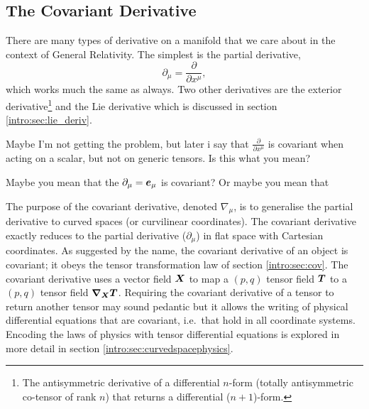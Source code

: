 \subsection{The Covariant Derivative}\label{intro:sec:covariant_derivative}

There are many types of derivative on a manifold that we care about in the context of General Relativity. The simplest is the partial derivative, 
\begin{equation}
\partial_\mu = \frac{\partial}{\partial x^\mu},
\end{equation} 
which works much the same as always. Two other derivatives are the exterior derivative\footnote{The antisymmetric derivative of a differential $n$-form (totally antisymmetric co-tensor of rank $n$) that returns a differential ($n+1$)-form. } and the Lie derivative which is discussed in section \ref{intro:sec:lie_deriv}. 

\color{choral} Maybe I'm not getting the problem, but later i say that $\frac{\partial}{\partial x^\mu}$ is covariant when acting on a scalar, but not on generic tensors. Is this what you mean? \color{black}

\color{choral} Maybe you mean that the $\partial_\mu = \boldsymbol{e}_\mu$ is covariant? Or maybe you mean that \color{black}

The purpose of the covariant derivative, denoted $\nabla_\mu$, is to generalise the partial derivative to curved spaces (or curvilinear coordinates). The covariant derivative exactly reduces to the partial derivative ($\partial_\mu$) in flat space with Cartesian coordinates. As suggested by the name, the covariant derivative of an object is covariant; it obeys the tensor transformation law of section \ref{intro:sec:cov}. The covariant derivative uses a vector field $\boldsymbol{X}$ to map a $(p,q)$ tensor field $\boldsymbol{T}$ to 
 a $(p,q)$ tensor field ${\boldsymbol{\nabla}_{\boldsymbol{X}}} \boldsymbol{T}$. Requiring the covariant derivative of a tensor to return another tensor may sound pedantic but it allows the writing of physical differential equations that are covariant, i.e.~that hold in all coordinate systems. Encoding the laws of physics with tensor differential equations is explored in more detail in section \ref{intro:sec:curvedspacephysics}. 


